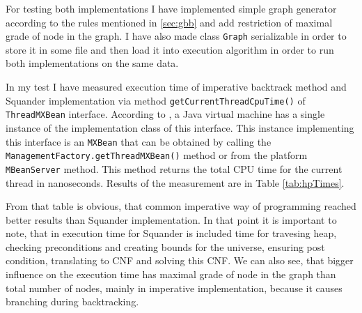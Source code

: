 \documentclass[11pt,twoside,a4paper]{book}
\begin{document}


For testing both implementations I have implemented simple graph generator
according to the rules mentioned in \ref{sec:gbb} and add restriction of maximal
grade of node in the graph. I have also made class \verb|Graph| serializable in
order to store it in some file and then load it into execution algorithm in order to run
both implementations on the same data.

In my test I have measured execution time of imperative backtrack method and
Squander implementation via method \verb|getCurrentThreadCpuTime()| of
\verb|ThreadMXBean| interface. According to \cite{oracle:javadoc}, a Java
virtual machine has a single instance of the implementation class of this interface. This instance implementing this
interface is an \verb|MXBean| that can be obtained by calling the
\verb|ManagementFactory.getThreadMXBean()| method or from the platform
\verb|MBeanServer| method. This method returns the total CPU time for the
current thread in nanoseconds. Results of the measurement are in Table
\ref{tab:hpTimes}.

From that table is obvious, that common imperative way of programming reached
better results than Squander implementation. In that point it is important to
note, that in execution time for Squander is included time for travesing heap,
checking preconditions and creating bounds for the universe, ensuring post
condition, translating to CNF and solving this CNF. We can also see, that bigger
influence on the execution time has maximal grade of node in the graph than
total number of nodes, mainly in imperative implementation, because it causes
branching during backtracking.
\end{document}
